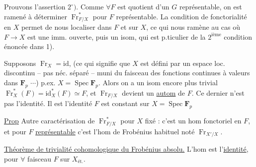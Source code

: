 Prouvons l'assertion $2^\circ)$. Comme $\forall F$  est quotient d'un $G$ représentable,  on est ramené à déterminer $\operatorname{Fr}_{F/X}^*$ pour $F$  représentable.
La condition de fonctorialité en $X$   permet de nous localiser dans $F$ et sur $X$, ce qui nous ramène au cas où $F\to X$ est une imm. ouverte, puis un isom, qui est p.ticulier de la $2^{\text{ième}}$ condition énoncée dans 1).

Supposons $\operatorname{Fr}_X=\mathrm{id}$, (ce qui signifie que $X$ est défini par un espace loc.  discontinu -- pas néc. séparé -- muni du faisceau des fonctions continues à valeurs dans $\mathbf F_p$ $\cdots$) p.ex. $X=\operatorname{Spec}\mathbf F_p$. Alors on a un isom encore plus trivial $\operatorname{Fr}_X^*(F)=\mathrm{id}_X^*(F)\simeq F$, et $\operatorname{Fr}_{F/X}$ devient un \uline{autom} de $F$. Ce dernier n'est pas   l'identité. Il est l'identité  $F$ est constant sur $X=\operatorname{Spec}\mathbf F_p$

\uline{Prop} Autre caractérisation de $\operatorname{Fr}_{F/X}^*$ pour $X$ fixé : c'est un hom fonctoriel en $F$, et pour $F$ \uline{représentable}  c'est l'hom de Frobénius habituel noté $\operatorname{Fr}_{X'/X}$.

\uline{Théorème de trivialité cohomologique du Frobénius absolu.}
L'hom
est l'\uline{identité}, pour $\forall$ faisceau $F$ sur $X_{\text{ét.}}$.

